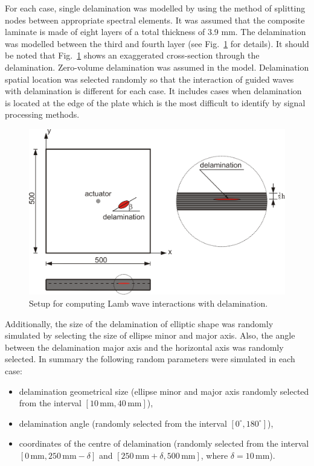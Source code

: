 For each case, single delamination was modelled by using the method of splitting nodes between appropriate spectral elements. 
It was assumed that the composite laminate is made of eight layers of a total thickness of 3.9 mm.
The delamination was modelled between the third and fourth layer (see Fig.~\ref{fig:plate_setup} for details).
It should be noted that Fig.~\ref{fig:plate_setup} shows an exaggerated cross-section through the delamination. 
Zero-volume delamination was assumed in the model. 
Delamination spatial location was selected randomly so that the interaction of guided waves with delamination is different for each case.
It includes cases when delamination is located at the edge of the plate which is the most difficult to identify by signal processing methods.
\begin{figure}
	\centering
	\includegraphics[scale=1]{Figures/Chapter_4/plate_delam_arrangement_MSSP.PNG}
	\caption{Setup for computing Lamb wave interactions with delamination.}
	\label{fig:plate_setup}
\end{figure}
Additionally, the size of the delamination of elliptic shape was randomly simulated by selecting the size of ellipse minor and major axis.
Also, the angle between the delamination major axis and the horizontal axis was randomly selected.
In summary the following random parameters were simulated in each case:
\begin{itemize}
	\item delamination geometrical size	(ellipse minor and major axis randomly selected from the interval \(\left[10 \, \textrm{mm}, 40\, \textrm{mm}\right]\)),
	\item delamination angle (randomly selected from the interval \( \left[ 0^{\circ}, 180^{\circ} \right]\)),
	\item coordinates of the centre of delamination (randomly selected from the interval \(\left[0\, \textrm{mm}, 250\, \textrm{mm} -\delta \right]\) and \( \left[250\, \textrm{mm}+\delta, 500\, \textrm{mm} \right] \), where \(\delta = 10\, \textrm{mm}\)).
\end{itemize}
